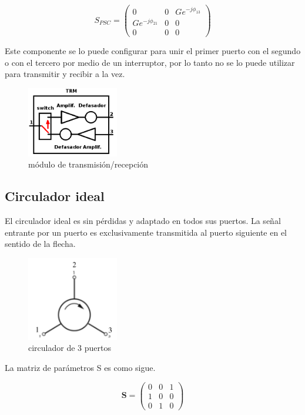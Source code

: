 $$
	S_{PSC} = \begin{pmatrix} 0&0&Ge^{-j\phi_{13}} \\ Ge^{-j\phi_{21}}&0&0 \\ 0&0&0\end{pmatrix} 
$$

Este componente se lo puede configurar para unir el primer puerto con el segundo o con el tercero por medio de un interruptor, 
por lo tanto no se lo puede utilizar para transmitir y recibir a la vez. 

\begin{figure}[H]
 \centering
 \includegraphics[width=4cm]{gfx/trm.png}
 \caption{módulo de transmisión/recepción}
 \label{fig:trm}
\end{figure}


\subsection{Circulador ideal}

El circulador ideal es sin pérdidas y adaptado en todos sus puertos. La señal entrante por un puerto es exclusivamente
transmitida al puerto siguiente en el sentido de la flecha.

\begin{figure}[H]
 \centering
 \includegraphics[width=4cm]{gfx/circulator.png}
 \caption{circulador de 3 puertos}
 \label{fig:circulator}
\end{figure}

La matriz de parámetros S es como sigue.

$$
\mathbf{S} = \begin{pmatrix} 0 & 0 & 1\\1 & 0 & 0\\0 & 1 & 0\end{pmatrix}
$$


